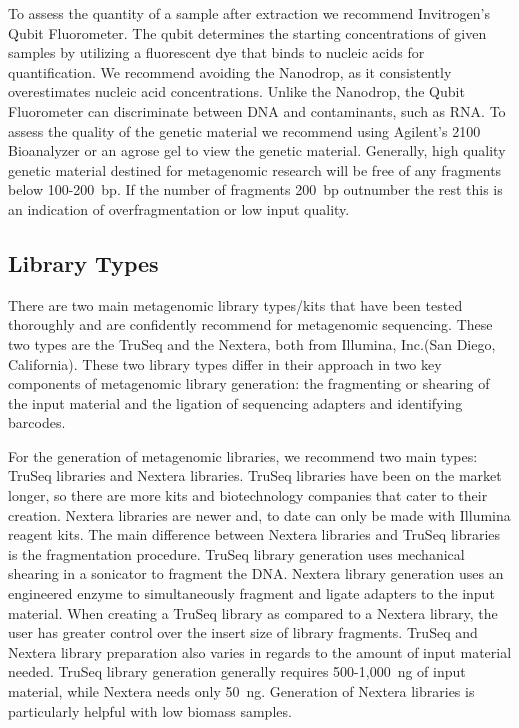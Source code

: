 \documentclass[graybox]{svmult}
\begin{document}
To assess the quantity of a sample after extraction we recommend Invitrogen’s Qubit Fluorometer. The qubit determines the starting concentrations of given samples by utilizing a fluorescent dye that binds to nucleic acids for quantification. We recommend avoiding the Nanodrop, as it consistently overestimates nucleic acid concentrations. Unlike the Nanodrop, the Qubit Fluorometer can discriminate between DNA and contaminants, such as RNA.
%
To assess the quality of the genetic material we recommend using Agilent’s 2100 Bioanalyzer or an agrose gel to view the genetic material. Generally, high quality genetic material destined for metagenomic research will be free of any fragments below 100-200~bp.  If the number of fragments 200~bp outnumber the rest this is an indication of overfragmentation or low input quality.

\subsection{Library Types}
There are two main metagenomic library types/kits that have been tested thoroughly and are confidently recommend for metagenomic sequencing.  These two types are the TruSeq and the Nextera, both from Illumina, Inc.(San Diego, California). These two library types differ in their approach in two key components of metagenomic library generation: the fragmenting or shearing of the input material and the ligation of sequencing adapters and identifying barcodes. 

For the generation of metagenomic libraries, we recommend two main types: TruSeq libraries and Nextera libraries.  TruSeq libraries have been on the market longer, so there are more kits and biotechnology companies that cater to their creation. 
Nextera libraries are newer and, to date can only be made with Illumina reagent kits.  
The main difference between Nextera libraries and TruSeq libraries is the fragmentation procedure. 
TruSeq library generation uses mechanical shearing in a sonicator to fragment the DNA. 
Nextera library generation uses an engineered enzyme to simultaneously fragment and ligate adapters to the input material. 
When creating a TruSeq library as compared to a Nextera library, the user has greater control over the insert size of library fragments.  
TruSeq and Nextera library preparation also varies in regards to the amount of input material needed. TruSeq library generation generally requires 500-1,000~ng of input material, while Nextera needs only 50~ng. Generation of Nextera libraries is particularly helpful with low biomass samples.
\end{document}
